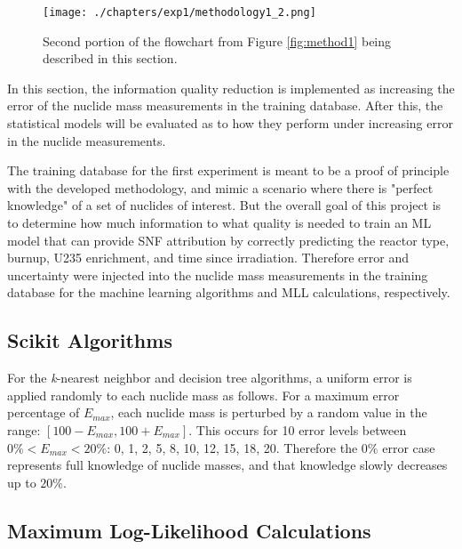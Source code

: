 \begin{figure}[H]
  \centering
  \texttt{[image: ./chapters/exp1/methodology1\_2.png]}
  \caption[Second portion of the flowchart from Figure \ref{fig:method1}]
          {Second portion of the flowchart from Figure \ref{fig:method1} being 
           described in this section.}
\end{figure}

In this section, the information quality reduction is implemented as increasing
the error of the nuclide mass measurements in the training database. After
this, the statistical models will be evaluated as to how they perform under
increasing error in the nuclide measurements. 

The training database for the first experiment is meant to be a proof of
principle with the developed methodology, and mimic a scenario where there is
"perfect knowledge" of a set of nuclides of interest.  But the overall goal of
this project is to determine how much information to what quality is needed to
train an \gls{ML} model that can provide \gls{SNF} attribution by correctly
predicting the reactor type, burnup, \gls{U235} enrichment, and time since
irradiation.  Therefore error and uncertainty were injected into the nuclide
mass measurements in the training database for the machine learning algorithms
and \gls{MLL} calculations, respectively. 

\subsection{Scikit Algorithms}

For the \textit{k}-nearest neighbor and decision tree algorithms, a uniform
error is applied randomly to each nuclide mass as follows.  For a maximum error
percentage of $E_{max}$, each nuclide mass is perturbed by a random value in the
range: $[100-E_{max},100+E_{max}]$.  This occurs for 10 error levels between
$0\% < E_{max} < 20\%$: 0, 1, 2, 5, 8, 10, 12, 15, 18, 20. Therefore the $0\%$
error case represents full knowledge of nuclide masses, and that knowledge
slowly decreases up to $20\%$. 

\subsection{Maximum Log-Likelihood Calculations}

